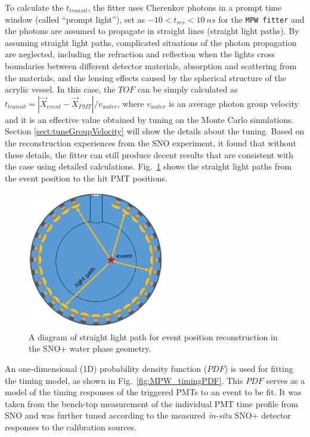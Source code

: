 To calculate the $t_{transit}$, the fitter uses Cherenkov photons in a prompt time window (called ``prompt light''), set as $-10<t_{res}<10~ns$ for the \texttt{MPW fitter} and the photons are assumed to propagate in straight lines (straight light paths). By assuming straight light paths, complicated situations of the photon propagation are neglected, including the refraction and reflection when the lights cross boundaries between different detector materials, absorption and scattering from the materials, and the lensing effects caused by the spherical structure of the acrylic vessel. In this case, the $TOF$ can be simply calculated as $t_{transit}=|\vec{X}_{event}-\vec{X}_{PMT}|/v_{water}$, where $v_{water}$ is an average photon group velocity and it is an effective value obtained by tuning on the Monte Carlo simulations. Section \ref{sect:tuneGroupVelocity} will show the details about the tuning. Based on the reconstruction experiences from the SNO experiment, it found that without these details, the fitter can still produce decent results that are consistent with the case using detailed calculations\cite{boulay2004direct,jones2011background}. Fig.~\ref{mpwdiagram_position} shows the straight light paths from the event position to the hit PMT positions.
\begin{figure}[htbp]
	\centering
   \includegraphics[width=6cm]{mpwDiagram.png}
	\caption[Straight light path calculation in the water geometry.]{A diagram of straight light path for event position reconstruction in the SNO+ water phase geometry.}
	\label{mpwdiagram_position}
\end{figure}

An one-dimensional (1D) probability density function ($PDF$) is used for fitting the timing model, as shown in Fig.~\ref{fig:MPW_timingPDF}. This $PDF$ serves as a model of the timing responses of the triggered PMTs to an event to be fit. It was taken from the bench-top measurement of the individual PMT time profile from SNO\cite{jillings1996photomultiplier} and was further tuned according to the measured \emph{in-situ} SNO+ detector responses to the calibration sources\cite{anderson2021optical}.

